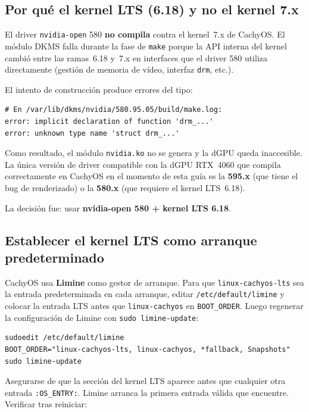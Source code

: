 \documentclass[12pt,a4paper]{article}
\begin{document}
\subsection{Por qué el kernel LTS (6.18) y no el kernel 7.x}
\label{sec:kernel-lts}

El driver \texttt{nvidia-open} 580 \textbf{no compila} contra el kernel~7.x
de CachyOS. El módulo DKMS falla durante la fase de \texttt{make} porque la
API interna del kernel cambió entre las ramas~6.18 y~7.x en interfaces que
el driver 580 utiliza directamente (gestión de memoria de vídeo, interfaz
\texttt{drm}, etc.).

El intento de construcción produce errores del tipo:

\begin{lstlisting}[style=bash]
# En /var/lib/dkms/nvidia/580.95.05/build/make.log:
error: implicit declaration of function 'drm_...'
error: unknown type name 'struct drm_...'
\end{lstlisting}

Como resultado, el módulo \texttt{nvidia.ko} no se genera y la dGPU queda
inaccesible. La única versión de driver compatible con la dGPU RTX~4060 que
compila correctamente en CachyOS en el momento de esta guía es la
\textbf{595.x} (que tiene el bug de renderizado) o la \textbf{580.x} (que
requiere el kernel LTS~6.18).

La decisión fue: usar \textbf{nvidia-open 580 + kernel LTS 6.18}.

\subsection{Establecer el kernel LTS como arranque predeterminado}

CachyOS usa \textbf{Limine} como gestor de arranque. Para que
\texttt{linux-cachyos-lts} sea la entrada predeterminada en cada arranque,
editar \texttt{/etc/default/limine} y colocar la entrada LTS antes que
\texttt{linux-cachyos} en \texttt{BOOT\_ORDER}. Luego regenerar la
configuración de Limine con \texttt{sudo limine-update}:

\begin{lstlisting}[style=bash]
sudoedit /etc/default/limine
BOOT_ORDER="linux-cachyos-lts, linux-cachyos, *fallback, Snapshots"
sudo limine-update
\end{lstlisting}


Asegurarse de que la sección del kernel LTS aparece antes que cualquier otra
entrada \texttt{:OS\_ENTRY:}. Limine arranca la primera entrada válida que
encuentre. Verificar tras reiniciar:
\end{document}
